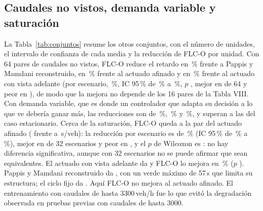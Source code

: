 \documentclass[journal]{IEEEtran}
\newcommand{\FLC}{FLC-O}
\newcommand{\PMR}{Pappis y Mamdani reconstruido}
\begin{document}
\subsection{Caudales no vistos, demanda variable y saturación}
\label{sec:res-otros}
La Tabla~\ref{tab:conjuntos} resume los otros conjuntos, con el número de unidades, el intervalo de confianza de cada media y la reducción de \FLC{} por unidad. Con 64 pares de caudales no vistos, \FLC{} reduce el retardo en \RedPapNv\,\% frente a \PMR{}, en \RedActAfNv\,\% frente al actuado afinado y en \RedActVNv\,\% frente al actuado con vista adelante (por escenario, \EscActVNvRed\,\%, IC 95\,\% de \EscActVNvLo\,\% a \EscActVNvHi\,\%, $p$ \EscActVNvP{}, mejor en \EscActVNvMejor{} de 64 y peor en \EscActVNvPeor{}), de modo que la mejora no depende de los 16 pares de la Tabla VIII. Con demanda variable, que es donde un controlador que adapta su decisión a lo que ve debería ganar más, las reducciones son de \RedPapVa\,\%, \RedActAfVa\,\% y \RedActVVa\,\%, y superan a las del caso estacionario. Cerca de la saturación, \FLC{} queda a la par del actuado afinado (\DelaySaFlc{} frente a \DelaySaActAf{}\,s/veh): la reducción por escenario es de \EscActAfSaRed\,\% (IC 95\,\% de \EscActAfSaLo\,\% a \EscActAfSaHi\,\%), mejor en \EscActAfSaMejor{} de 32 escenarios y peor en \EscActAfSaPeor{}, y el $p$ de Wilcoxon es \EscActAfSaP{}: no hay diferencia significativa, aunque con 32 escenarios no se puede afirmar que sean equivalentes. El actuado con vista adelante da \DelaySaActV{} y \FLC{} lo mejora en \EscActVSaRed\,\% ($p$ \EscActVSaP{}). \PMR{} da \DelaySaPap{}, con un verde máximo de 57\,s que limita su estructura; el ciclo fijo da \DelaySaFijo{}. Aquí \FLC{} no mejora al actuado afinado. El entrenamiento con caudales de hasta 3300\,veh/h fue lo que evitó la degradación observada en pruebas previas con caudales de hasta 3000.


\end{document}
